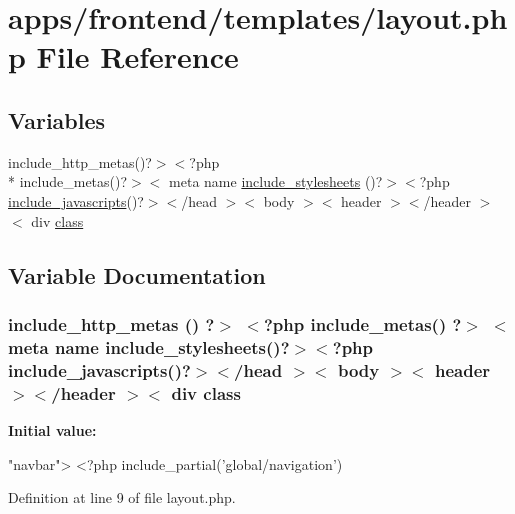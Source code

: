 \hypertarget{frontend_2templates_2layout_8php}{\section{apps/frontend/templates/layout.php File Reference}
\label{frontend_2templates_2layout_8php}
}
\subsection*{Variables}
\begin{DoxyCompactItemize}
\item 
include\-\_\-http\-\_\-metas()?$>$$<$?php \\*
include\-\_\-metas()?$>$$<$ meta name \hyperlink{frontend_2templates_2layout_8php_ad0b43e43d7f3026d5194056367208d92}{include\-\_\-stylesheets} ()?$>$$<$?php \hyperlink{presse_2templates_2layout_8php_a47feb3ae82d801315676f1bde1678c3e}{include\-\_\-javascripts}()?$>$$<$/head $>$$<$ body $>$$<$ header $>$$<$/header $>$$<$ div \hyperlink{live_2modules_2news_2templates_2__actualitelight_8php_a185c73c6507391d1eb38c776b68ce96d}{class}
\end{DoxyCompactItemize}


\subsection{Variable Documentation}
\hypertarget{frontend_2templates_2layout_8php_ad0b43e43d7f3026d5194056367208d92}{
\subsubsection[{include\-\_\-stylesheets}]{\setlength{\rightskip}{0pt plus 5cm}include\-\_\-http\-\_\-metas () ?$>$ $<$?php include\-\_\-metas() ?$>$ $<$meta name include\-\_\-stylesheets()?$>$$<$?php {\bf include\-\_\-javascripts}()?$>$$<$/head $>$$<$ body $>$$<$ header $>$$<$/header $>$$<$ div {\bf class}}}\label{frontend_2templates_2layout_8php_ad0b43e43d7f3026d5194056367208d92}
{\bfseries Initial value\-:}
\begin{DoxyCode}
\textcolor{stringliteral}{"navbar"}>
      <?php include\_partial(\textcolor{stringliteral}{'global/navigation'})
\end{DoxyCode}


Definition at line 9 of file layout.\-php.

